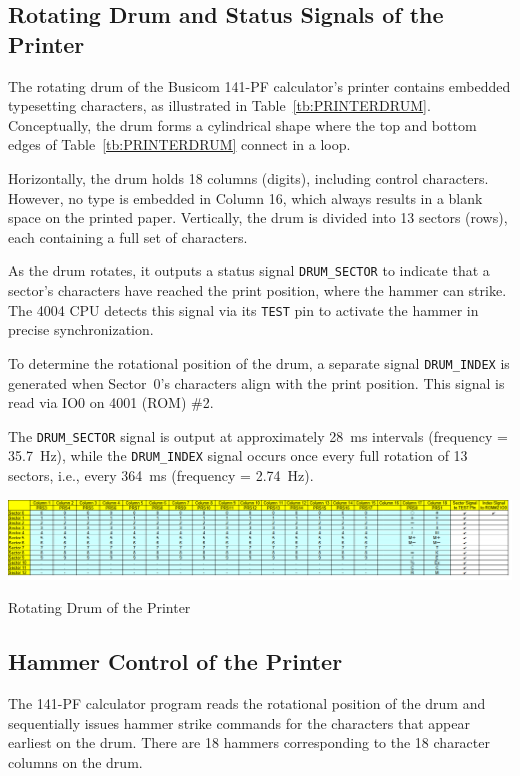 \subsection{Rotating Drum and Status Signals of the Printer}
The rotating drum of the Busicom 141-PF calculator's printer contains embedded typesetting characters, as illustrated in Table~\ref{tb:PRINTERDRUM}. Conceptually, the drum forms a cylindrical shape where the top and bottom edges of Table~\ref{tb:PRINTERDRUM} connect in a loop.

Horizontally, the drum holds 18 columns (digits), including control characters. However, no type is embedded in Column 16, which always results in a blank space on the printed paper. Vertically, the drum is divided into 13 sectors (rows), each containing a full set of characters.

As the drum rotates, it outputs a status signal \texttt{DRUM\_SECTOR} to indicate that a sector's characters have reached the print position, where the hammer can strike. The 4004 CPU detects this signal via its \texttt{TEST} pin to activate the hammer in precise synchronization.

To determine the rotational position of the drum, a separate signal \texttt{DRUM\_INDEX} is generated when Sector~0's characters align with the print position. This signal is read via IO0 on 4001 (ROM) \#2.

The \texttt{DRUM\_SECTOR} signal is output at approximately 28~ms intervals (frequency = 35.7~Hz), while the \texttt{DRUM\_INDEX} signal occurs once every full rotation of 13 sectors, i.e., every 364~ms (frequency = 2.74~Hz).

\begin{table}[htbp]
    \includegraphics[width=1.00\columnwidth]{./Table/PrinterDrum.png}
    \caption{Rotating Drum of the Printer}
    \label{tb:PRINTERDRUM}
\end{table}

\subsection{Hammer Control of the Printer}
The 141-PF calculator program reads the rotational position of the drum and sequentially issues hammer strike commands for the characters that appear earliest on the drum. There are 18 hammers corresponding to the 18 character columns on the drum.

